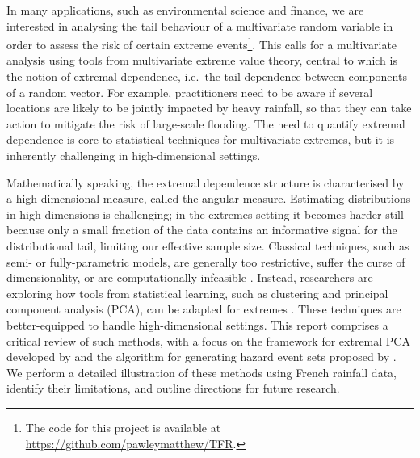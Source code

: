 \documentclass[en-GB, a4paper, nobind]{templates/bathreport}
\begin{document}
\minitoc

\noindent In many applications, such as environmental science and finance, we are interested in analysing the tail behaviour of a multivariate random variable in order to assess the risk of certain extreme events\footnote{The code for this project is available at \url{https://github.com/pawleymatthew/TFR}.}. This calls for a multivariate analysis using tools from multivariate extreme value theory, central to which is the notion of extremal dependence, i.e.~the tail dependence between components of a random vector. For example, practitioners need to be aware if several locations are likely to be jointly impacted by heavy rainfall, so that they can take action to mitigate the risk of large-scale flooding. The need to quantify extremal dependence is core to statistical techniques for multivariate extremes, but it is inherently challenging in high-dimensional settings.

Mathematically speaking, the extremal dependence structure is characterised by a high-dimensional measure, called the angular measure. Estimating distributions in high dimensions is challenging; in the extremes setting it becomes harder still because only a small fraction of the data contains an informative signal for the distributional tail, limiting our effective sample size. Classical techniques, such as semi- or fully-parametric models, are generally too restrictive, suffer the curse of dimensionality, or are computationally infeasible \autocite{gumbelBivariateExponentialDistributions1960,tawnBivariateExtremeValue1988,huslerMaximaNormalRandom1989,wackernagelMultivariateGeostatisticsIntroduction1995,boldiMixtureModelMultivariate2007,decarvalhoSpectralDensityRatio2014,hansonBernsteinPolynomialAngular2017}. Instead, researchers are exploring how tools from statistical learning, such as clustering and principal component analysis (PCA), can be adapted for extremes \autocite{bernardClusteringMaximaSpatial2013,chautruDimensionReductionMultivariate2015,cooleyDecompositionsDependenceHighdimensional2019,fomichovDetectionGroupsConcomitant2020,janssenKmeansClusteringExtremes2020,dreesPrincipalComponentAnalysis2021,rohrbeckSimulatingFloodEvent2021}. These techniques are better-equipped to handle high-dimensional settings. This report comprises a critical review of such methods, with a focus on the framework for extremal PCA developed by \textcite{cooleyDecompositionsDependenceHighdimensional2019} and the algorithm for generating hazard event sets proposed by \textcite{rohrbeckSimulatingFloodEvent2021}. We perform a detailed illustration of these methods using French rainfall data, identify their limitations, and outline directions for future research.
\end{document}
